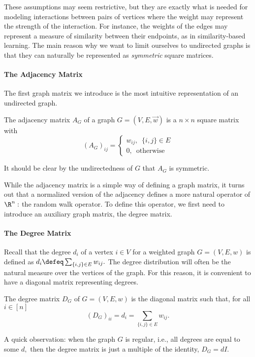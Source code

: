 These assumptions may seem restrictive, but they are exactly what is needed for modeling interactions between pairs of vertices where the weight may represent the strength of the interaction. For instance, the weights of the edges may represent a measure of similarity between their endpoints, as in similarity-based learning.
%
The main reason why we want to limit ourselves to undirected graphs is that they can naturally be represented as {\it symmetric} square matrices. 

\paragraph{The Adjacency Matrix} The first graph matrix we introduce is the most intuitive representation of an undirected graph.
\begin{definition}
The adjacency matrix $A_G$ of a graph $G=(V,E, \vec{w})$ is a $n \times n$ square matrix with
$$
(A_G)_ {ij}= 
							\begin{cases}
							w_{ij}, \enspace \{i,j\} \in E \\
							0,       \enspace \textrm{otherwise}
							\end{cases}
$$
\end{definition}
It should be clear by the undirectedness of $G$ that ${A}_G$ is symmetric.


While the adjacency matrix is a simple way of defining a graph matrix, it turns out that a normalized version of the adjacency defines a more natural operator of $\R^n:$ the random walk operator. To define this operator, we first need to introduce an auxiliary graph matrix, the degree matrix.



\paragraph{The Degree Matrix}

Recall that the degree $d_i$ of a vertex $i \in V$ for a weighted graph $G=(V,E, w)$ is defined as $d_i \defeq \sum_{\{i,j\} \in E} w_{ij}.$ The degree distribution will often be the natural measure over the vertices of the graph. For this reason, it is convenient to have a diagonal matrix representing degrees.
\begin{definition}
The degree matrix ${D}_G$ of $G=(V,E, w)$ is  the diagonal matrix such that, for all $i \in [n]$
$$
({D}_G)_{ii} = d_i = \sum_{\{i,j\} \in E} w_{ij}.
$$ 
\end{definition}
A quick observation: when the graph $G$ is regular, i.e., all degrees are equal to some $d,$ then the degree matrix is just a multiple of the identity, $D_G = dI.$

